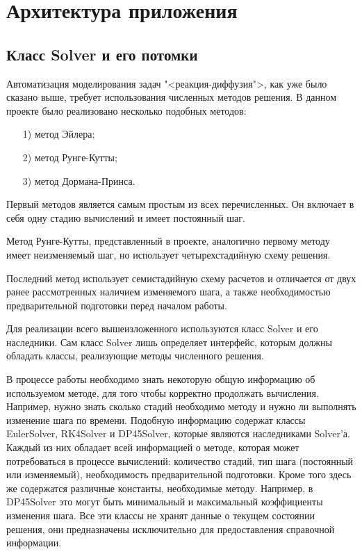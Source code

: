 \documentclass[a4paper, 14pt]{extarticle}
\theoremstyle{definition}
\begin{document}
\section{Архитектура приложения}

\subsection{Класс Solver и его потомки}

\par Автоматизация моделирования задач "<реакция-диффузия">, как уже было сказано выше, требует использования численных методов решения. В данном проекте было реализовано несколько подобных методов:
\begin{enumerate}
\item[1)] метод Эйлера;
\item[2)] метод Рунге-Кутты;
\item[3)] метод Дормана-Принса.
\end{enumerate}

\par Первый методов является самым простым из всех перечисленных. Он включает в себя одну стадию вычислений и имеет постоянный шаг.

\par Метод Рунге-Кутты, представленный в проекте, аналогично первому методу имеет неизменяемый шаг, но использует четырехстадийную схему решения.

\par Последний метод использует семистадийную схему расчетов и отличается от двух ранее рассмотренных наличием изменяемого шага, а также необходимостью предварительной подготовки перед началом работы.

\par Для реализации всего вышеизложенного используются класс Solver и его наследники. Сам класс Solver лишь определяет интерфейс, которым должны обладать классы, реализующие методы численного решения.

\par В процессе работы необходимо знать некоторую общую информацию об используемом методе, для того чтобы корректно продолжать вычисления. Например, нужно знать сколько стадий необходимо методу и нужно ли выполнять изменение шага по времени. Подобную информацию содержат классы EulerSolver, RK4Solver и DP45Solver, которые являются наследниками Solver'а. Каждый из них обладает всей информацией о методе, которая может потребоваться в процессе вычислений: количество стадий, тип шага (постоянный или изменяемый), необходимость предварительной подготовки. Кроме того здесь же содержатся различные константы, необходимые методу. Например, в DP45Solver это могут быть минимальный и максимальный коэффициенты изменения шага. Все эти классы не хранят данные о текущем состоянии решения, они предназначены исключительно для предоставления справочной информации.
\end{document}
